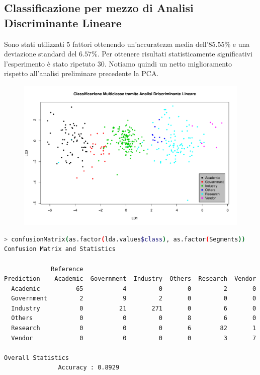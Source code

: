 \documentclass[11pt,a4paper]{article}
\begin{document}
\subsection{Classificazione per mezzo di Analisi Discriminante Lineare}
Sono stati utilizzati $5$ fattori ottenendo  un'accuratezza media dell'$85.55\%$
e una deviazione standard del $6.57\%$. Per ottenere risultati statisticamente
significativi l'esperimento \`e stato ripetuto $30$. Notiamo quindi un netto
miglioramento rispetto all'analisi preliminare precedente la PCA.
\begin{figure}[H]
	\vspace{-2.5cm}
	\hspace{-0.8cm}
	\includegraphics[scale=.61]{imgs/LDA_plot.pdf}
\end{figure}
\vspace{-0.6cm}
\begin{lstlisting}[language=bash,basicstyle=\scriptsize,tabsize=2,frame = single]
> confusionMatrix(as.factor(lda.values$class), as.factor(Segments))
Confusion Matrix and Statistics

             Reference
Prediction    Academic  Government  Industry  Others  Research  Vendor
  Academic          65           4         0       0         2       0
  Government         2           9         2       0         0       0
  Industry           0          21       271       0         6       0
  Others             0           0         0       8         6       0
  Research           0           0         0       6        82       1
  Vendor             0           0         0       0         3       7

Overall Statistics
               Accuracy : 0.8929          
\end{lstlisting}
\end{document}
